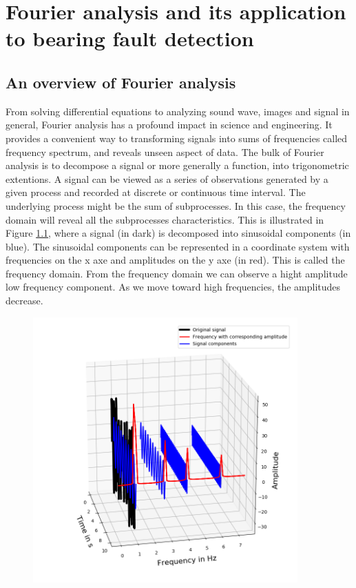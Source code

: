 \documentclass[../Main/thesis.tex]{subfiles}
\begin{document}
\chapter[Fourier analysis and its application to bearing fault detection]{Fourier analysis and its application to bearing fault detection}
\label{sec:chapter2}

\section{An overview of Fourier analysis}
From solving differential equations to analyzing sound wave, images and signal in general, Fourier analysis has a profound impact in science and engineering. It provides a convenient way to transforming signals into sums of frequencies called frequency spectrum, and reveals unseen aspect of data. The bulk of Fourier analysis is to decompose a signal or more generally a function, into trigonometric extentions. 
\justify
 A signal can be viewed as a series of observations generated by a given process and recorded at discrete or continuous time interval. The underlying process might be the sum of subprocesses. In this case, the frequency domain will reveal all the subprocesses characteristics.
This is illustrated in Figure \ref{fig:fft_domain}, where a signal (in dark) is decomposed into sinusoidal components (in blue). The sinusoidal components can be represented in a coordinate system with frequencies on the x axe and amplitudes on the y axe (in red). This is called the frequency domain. From the frequency domain we can observe a hight amplitude low frequency component. As we move toward high frequencies, the amplitudes decrease.
\begin{figure}[H] %
   \centering
   \includegraphics[width=4in]{../fig/fft_domain} 
   \caption{}
   \label{fig:fft_domain}
\end{figure}
\end{document}
